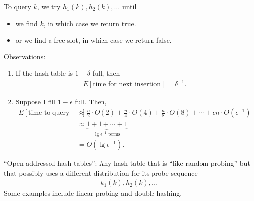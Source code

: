 \documentclass{report}
\begin{document}
\noindent To query $k$, we try $h_1(k), h_2(k), \ldots$ until 
\begin{itemize}
    \item we find $k$, in which case we return true.
    \item or we find a free slot, in which case we return false.
\end{itemize}
Observations:
\begin{enumerate}
    \item If the hash table is $1 - \delta$ full, then 
    \begin{align*}
        E[\text{time for next insertion}] = \delta^{-1}.
    \end{align*}
    \item Suppose I fill $1-\epsilon$ full. Then,
    \begin{align*}
        E[\text{time to query random elements of those present}] &\approx \frac n2 \cdot O(2) + \frac n4 \cdot O(4) + \frac n8 \cdot O(8) + \cdots + \epsilon n \cdot O(\epsilon^{-1})\\
        &\approx \underbrace{1 + 1 + \cdots + 1}_{\lg \epsilon^{-1} \text{ terms}} \\
        &= O(\lg \epsilon^{-1}).
    \end{align*}
\end{enumerate}
``Open-addressed hash tables'': Any hash table that is ``like random-probing'' but that possibly uses a different distribution for its probe sequence
\begin{align*}
    h_1(k), h_2(k), \ldots
\end{align*}
Some examples include linear probing and double hashing. 
\end{document}
